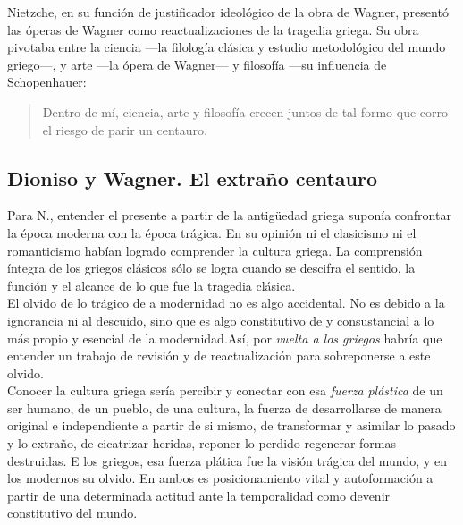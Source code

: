 \documentclass[a4paper, 10pt, twocolumn, spanish]{article}
\begin{document}
Nietzche, en su función de justificador ideológico de la obra de
Wagner, presentó las óperas de Wagner como reactualizaciones de la
tragedia griega. Su obra pivotaba entre la ciencia —la filología
clásica y estudio metodológico del mundo griego—, y arte —la ópera de
Wagner— y filosofía —su influencia de Schopenhauer:

\begin{quote}
Dentro de mí, ciencia, arte y filosofía crecen juntos de tal formo que
corro el riesgo de parir un centauro.
\end{quote}

\subsection{Dioniso y Wagner. El extraño centauro}
\label{sec:orgfc6fa9d}
Para N., entender el presente a partir de la antigüedad griega suponía
confrontar la época moderna con la época trágica. En su opinión ni el
clasicismo ni el romanticismo habían logrado comprender la cultura
griega. La comprensión íntegra de los griegos clásicos sólo se logra
cuando se descifra el sentido, la función y el alcance de lo que fue
la tragedia clásica.\\[0pt]

El olvido de lo trágico de a modernidad no es algo accidental. No es
debido a la ignorancia ni al descuido, sino que es algo constitutivo
de y consustancial a lo más propio y esencial de la modernidad.Así,
por \emph{vuelta a los griegos} habría que entender un trabajo de revisión
y de reactualización para sobreponerse a este olvido.\\[0pt]
Conocer la cultura griega sería percibir y conectar con esa \emph{fuerza}
\emph{plástica} de un ser humano, de un pueblo, de una cultura, la fuerza
de desarrollarse de manera original e independiente a partir de si
mismo, de transformar y asimilar lo pasado y lo extraño, de cicatrizar
heridas, reponer lo perdido regenerar formas destruidas. E los
griegos, esa fuerza plática fue la visión trágica del mundo, y en los
modernos su olvido. En ambos es posicionamiento vital y autoformación
a partir de una determinada actitud ante la temporalidad como devenir
constitutivo del mundo.\\[0pt]
\end{document}
